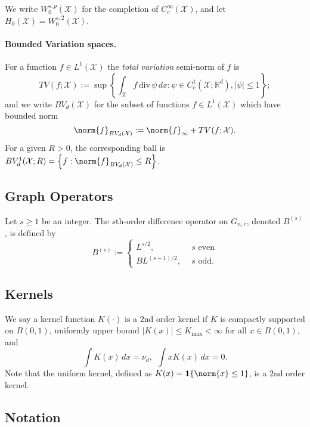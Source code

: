 \documentclass{article}
\newcommand{\Reals}{\mathbb{R}}
\newcommand{\abs}[1]{\left \lvert #1 \right \rvert}
\newcommand{\set}[1]{\left\{#1\right\}}
\newcommand{\1}{\mathbf{1}}
\newcommand{\Xset}{\mathcal{X}}
\newcommand{\Xsetive}{\mathrm{div}}
\theoremstyle{alden}
\theoremstyle{aldenthm}
\theoremstyle{definition}
\theoremstyle{remark}
\begin{document}
We write $W_0^{s,p}(\Xset)$ for the completion of $C_c^{\infty}(\Xset)$, and let $H_0(\Xset) = W_0^{s,2}(\Xset)$.  

\paragraph{Bounded Variation spaces.}

For a function $f \in L^1(\mathcal{X})$ the \emph{total variation} semi-norm of $f$ is
\begin{equation*}
TV(f;\mathcal{X}) := \sup \left\{ \int_{\mathcal{X}} f \, \Xsetive \, \psi \,dx : \psi \in C_c^1(\mathcal{X}; \Reals^d), \abs{\psi} \leq 1 \right\};
\end{equation*}
and we write $BV_d(\mathcal{X})$ for the subset of functions $f \in L^1(\mathcal{X})$ which have bounded norm
\begin{equation*}
\norm{f}_{BV_d(\mathcal{X})} := \norm{f}_{\infty} + TV(f;\mathcal{X}).
\end{equation*}
For a given $R > 0$, the corresponding ball is $BV_d^{1}(\mathcal{X};R) = \set{f: \norm{f}_{BV_d(\mathcal{X})} \leq R}$. 

\subsection{Graph Operators}
Let $s \geq 1$ be an integer. The $s$th-order difference operator on $G_{n,r}$, denoted $B^{(s)}$, is defined by
\begin{equation*}
B^{(s)} :=
\begin{cases}
L^{s/2},& ~~ s \textrm{ even} \\
BL^{(s - 1)/2},& ~~ s \textrm{ odd.}
\end{cases}
\end{equation*}

\subsection{Kernels}
We say a kernel function $K(\cdot)$ is a $2$nd order kernel if $K$ is compactly supported on $B(0,1)$, uniformly upper bound $\abs{K(x)} \leq K_{\max} < \infty$ for all $x \in B(0,1)$, and
\begin{equation*}
\int K(x) \,dx = \nu_d,~~ \int x K(x) \,dx = 0.
\end{equation*}
Note that the uniform kernel, defined as $K(x) = \1\{\norm{x} \leq 1\}$, is a $2$nd order kernel. 

\subsection{Notation}
\end{document}
